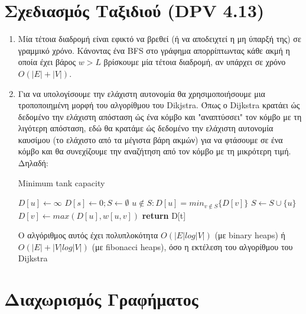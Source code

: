 \documentclass[a4paper,11pt]{article}
\begin{document}
\section{Σχεδιασμός Ταξιδιού (DPV 4.13)}
\begin{enumerate}
\item Μία τέτοια διαδρομή είναι εφικτό να βρεθεί (ή να αποδειχτεί η μη ύπαρξή
της) σε γραμμικό χρόνο. Κάνοντας ένα BFS στο γράφημα απορρίπτωντας κάθε ακμή η
οποία έχει βάρος $w > L$ βρίσκουμε μία τέτοια διαδρομή, αν υπάρχει σε χρόνο
$O(|E| + |V|)$.
\item Για να υπολογίσουμε την ελάχιστη αυτονομία θα χρησιμοποιήσουμε μια
τροποποιημένη μορφή του αλγορίθμου του Dikjstra. Όπως ο Dijkstra κρατάει ώς
δεδομένο την ελάχιστη απόσταση ώς ένα κόμβο και "αναπτύσσει" τον κόμβο με τη
λιγότερη απόσταση, εδώ θα κρατάμε ώς δεδομένο την ελάχιστη αυτονομία καυσίμου
(το ελάχιστο από τα μέγιστα βάρη ακμών) για να φτάσουμε σε ένα κόμβο και θα
συνεχίζουμε την αναζήτηση από τον κόμβο με τη μικρότερη τιμή. Δηλαδή:
\begin{algorithm}[H]
\caption{Minimum tank capacity}
\begin{algorithmic}[1]
	    \State $D[u] \gets \infty$
	\EndFor
	\State $D[s] \gets 0 ; S \gets \emptyset$
	    \State $u \notin S : D[u] = min_{v \notin S}\{D[v]\}$
		\State $S \gets S \cup \{u\}$
	\EndWhile
			\State $D[v] \gets max(D[u], w[u,v])$
		\EndIf
	\EndFor
	\State \textbf{return} D[t]
\EndProcedure
\end{algorithmic}
\end{algorithm}

Ο αλγόριθμος αυτός έχει πολυπλοκότητα $O(|E|log|V|)$ (με binary heaps) ή
$O(|E| + |V|log|V|)$ (με fibonacci heaps), όσο η εκτέλεση του αλγορίθμου του
Dijkstra
\end{enumerate}



\section{Διαχωρισμός Γραφήματος}
\end{document}
